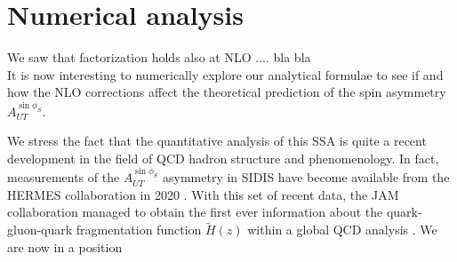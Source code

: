 
\chapter{Numerical analysis}
We saw that factorization holds also at NLO .... bla bla\\
It is now interesting to numerically explore our analytical formulae to see if and how the NLO corrections affect the theoretical prediction of the spin asymmetry $A_{UT}^{\sin\phi_S}$. 

We stress the fact that the quantitative analysis of this SSA is quite a recent development in the field of QCD hadron structure and phenomenology. In fact, measurements of the $A_{UT}^{\sin\phi_S}$ asymmetry in SIDIS have become available from the HERMES collaboration in 2020 \cite{hermescollaboration2020azimuthalsingledoublespinasymmetries}. With this set of recent data, the JAM collaboration managed to obtain the first ever information about the quark-gluon-quark fragmentation function $\tilde{H}(z) $ within a global QCD analysis \cite{Gamberg2022Htilde}. We are now in a position


